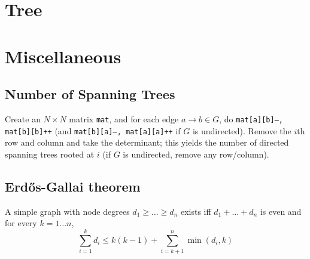 \section{Tree}

\section{Miscellaneous}
\subsection{Number of Spanning Trees}
Create an $N\times N$ matrix \texttt{mat}, and for each edge $a \rightarrow b
   \in G$, do \texttt{mat[a][b]--, mat[b][b]++} (and \texttt{mat[b][a]--,
   mat[a][a]++} if $G$ is undirected). Remove the $i$th row and column and take
the determinant; this yields the number of directed spanning trees rooted at
$i$ (if $G$ is undirected, remove any row/column).

\subsection{Erdős-Gallai theorem}
A simple graph with node degrees $d_1 \ge \dots \ge d_n$ exists iff $d_1 +
   \dots + d_n$ is even and for every $k = 1\dots n$,
\[
\sum_{i=1}^{k} d_i \le k(k-1) + \sum_{i=k+1}^{n} \min(d_i, k)
\]
\par
